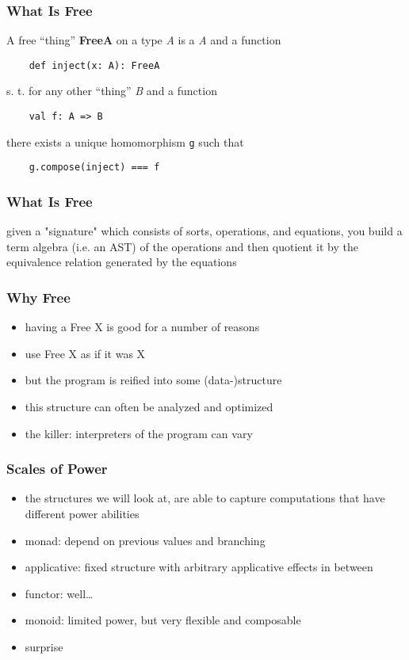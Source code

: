\documentclass{beamer}
\begin{document}
\begin{frame}[fragile]
  \frametitle{What Is Free} A free ``thing'' \textbf{FreeA} on a type
  \textit{A} is a \textit{A} and a function
  \begin{verbatim}
    def inject(x: A): FreeA
  \end{verbatim}
  s. t. for any other ``thing'' \textit{B} and a function
  \begin{verbatim}
    val f: A => B
  \end{verbatim}
  there exists a unique homomorphism \texttt{g} such that
  \begin{verbatim}
    g.compose(inject) === f
  \end{verbatim}
\end{frame}

\begin{frame}[fragile]
  \frametitle{What Is Free}
  given a "signature" which consists of
  sorts, operations, and equations, you build a term algebra (i.e. an
  AST) of the operations and then quotient it by the equivalence
  relation generated by the equations
\end{frame}

\begin{frame}
  \frametitle{Why Free}
  \begin{itemize}
  \item having a Free X is good for a number of reasons
  \item use Free X as if it was X
  \item but the program is reified into some (data-)structure
  \item this structure can often be analyzed and optimized
  \item the killer: interpreters of the program can vary
  \end{itemize}
\end{frame}

\begin{frame}
  \frametitle{Scales of Power}
  \begin{itemize}
  \item the structures we will look at, are able to capture computations that have different power abilities
  \item monad: depend on previous values and branching
  \item applicative: fixed structure with arbitrary applicative effects in between
  \item functor: well\ldots
  \item monoid: limited power, but very flexible and composable
  \item surprise
  \end{itemize}
\end{frame}
\end{document}
